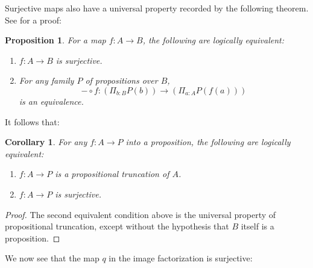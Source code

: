 \documentclass{amsart}
\theoremstyle{theorem}
\newtheorem*{cor}{Corollary}
\newtheorem*{prop}{Proposition}
\theoremstyle{definition}
\theoremstyle{remark}
\newcommand{\0}{\mathbbe{0}}
\newcommand{\1}{\mathbbe{1}}
\newcommand{\2}{\mathbbe{2}}
\newcommand{\3}{\mathbbe{3}}
\newcommand{\4}{\mathbbe{4}}
\newcommand{\term}[1]{{\textup{\texttt{#1}}}}
\newcommand{\type}[1]{{\textup{#1}}}
\newcommand{\refl}{\term{refl}}
\newcommand{\fib}{\type{fib}}
\newcommand{\mere}[1]{\|{#1}\|}
\begin{document}
Surjective maps also have a universal property recorded by the following theorem. See \cite{Rijke} for a proof:

\begin{prop} For a map $f \colon A \to B$, the following are logically equivalent:
\begin{enumerate}
\item $f \colon A \to B$ is surjective.
\item For any family $P$ of propositions over $B$, 
\[ -\circ f : \left( \Pi_{b:B} P(b) \right) \to \left( \Pi_{a:A} P(f(a)) \right)\]
is an equivalence.
\end{enumerate}
\end{prop}


It follows that:

\begin{cor} For any $f \colon A \to P$ into a proposition, the following are logically equivalent:
\begin{enumerate}
\item $f \colon A \to P$ is a propositional truncation of $A$.
\item $f \colon A \to P$ is surjective.
\end{enumerate}
\end{cor}
\begin{proof}
The second equivalent condition above is the universal property of propositional truncation, except without the hypothesis that $B$ itself is a proposition.
\end{proof}

We now see that the map $q$ in the image factorization is surjective:
\end{document}
